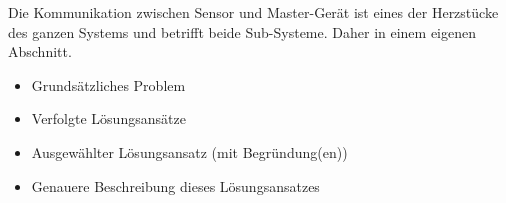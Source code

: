 Die   Kommunikation  zwischen   Sensor  und   Master-Ger\"at  ist   eines  der
Herzst\"ucke des ganzen Systems und betrifft beide Sub-Systeme. Daher in einem
eigenen Abschnitt.

\begin{itemize}
    \item
        Grunds\"atzliches Problem
    \item
        Verfolgte L\"osungsans\"atze
    \item
        Ausgew\"ahlter L\"osungsansatz (mit Begr\"undung(en))
    \item
        Genauere Beschreibung dieses L\"osungsansatzes
\end{itemize}
